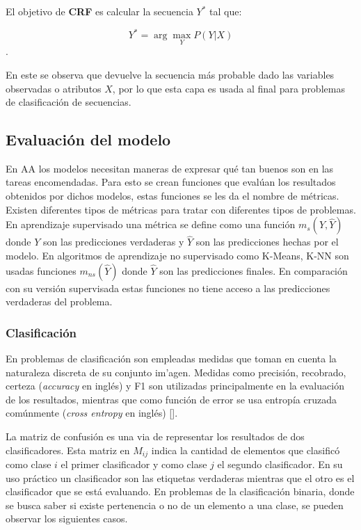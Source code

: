 El objetivo de \textbf{CRF} es calcular la secuencia $Y^*$ tal que:

\begin{equation}
	Y^* = \arg \max_Y P(Y | X)
\end{equation}\label{eq:crf}.

En este se observa que devuelve la secuencia más probable dado las variables observadas o atributos $X$,
por lo que esta capa es usada al final para problemas de clasificación de secuencias.

\subsection{Evaluación del modelo}

En AA los modelos necesitan maneras de expresar qué tan buenos son 
en las tareas encomendadas. Para esto se crean funciones que evalúan los resultados obtenidos
por dichos modelos, estas funciones se les da el nombre de métricas. Existen diferentes tipos de
métricas para tratar con diferentes tipos de problemas. En aprendizaje supervisado una métrica se
define como una función $m_s(Y, \hat{Y})$ donde $Y$ son las predicciones verdaderas y $\hat{Y}$ son las predicciones
hechas por el modelo. En algoritmos de aprendizaje no supervisado como K-Means, K-NN son usadas funciones $m_{ns}(\hat{Y})$
donde $\hat{Y}$ son las predicciones finales. En comparación con su versión supervisada estas funciones no tiene acceso
a las predicciones verdaderas del problema.

\subsubsection{Clasificación}

En problemas de clasificación son empleadas medidas que toman en cuenta la naturaleza discreta de su conjunto im'agen.
Medidas como precisión, recobrado, certeza (\emph{accuracy} en inglés) y F1 son utilizadas principalmente en la 
evaluación de los resultados, mientras que como función de error se usa entropía cruzada comúnmente 
(\emph{cross entropy} en inglés) [\cite{grandini2020metrics}].

La matriz de confusión es una via de representar los resultados de dos clasificadores. Esta matriz en $M_{ij}$ 
indica la cantidad de elementos que clasificó como clase $i$ el primer clasificador y
como clase $j$ el segundo clasificador. En su uso práctico
un clasificador son las etiquetas verdaderas mientras que el otro es el clasificador que se está evaluando. 
En problemas de la clasificación binaria, donde se busca saber si existe pertenencia o no de un elemento a una clase,
se pueden observar los siguientes casos.

